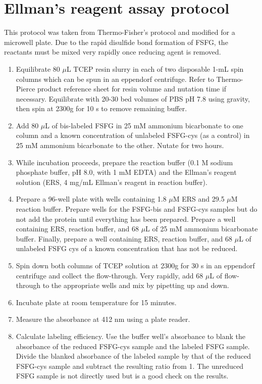 \section{Ellman's reagent assay protocol}

This protocol was taken from Thermo-Fisher's protocol and modified for a microwell plate.  Due to the rapid disulfide bond formation of FSFG, the reactants must be mixed very rapidly once reducing agent is removed.

\begin{enumerate}
\item Equilibrate 80 $\mu$L TCEP resin slurry in each of two disposable 1-mL spin columns which can be spun in an eppendorf centrifuge.  Refer to Thermo-Pierce product reference sheet for resin volume and nutation time if necessary.  Equilibrate with 20-30 bed volumes of PBS pH 7.8 using gravity, then spin at 2300g for 10 s to remove remaining buffer. 
\item Add 80 $\mu$L of bis-labeled FSFG in 25 mM ammonium bicarbonate to one column and a known concentration of unlabeled FSFG-cys (as a control) in 25 mM ammonium bicarbonate to the other. Nutate for two hours.
\item While incubation proceeds, prepare the reaction buffer (0.1 M sodium phosphate buffer, pH 8.0, with 1 mM EDTA) and the Ellman's reagent solution (ERS, 4 mg/mL Ellman's reagent in reaction buffer).
\item Prepare a 96-well plate with wells containing 1.8 $\mu$M ERS and 29.5 $\mu$M reaction buffer.  Prepare wells for the FSFG-bis and FSFG-cys samples but do not add the protein until everything has been prepared.  Prepare a well containing ERS, reaction buffer, and 68 $\mu$L of 25 mM ammonium bicarbonate buffer.  Finally, prepare a well containing ERS, reaction buffer, and 68 $\mu$L of unlabeled FSFG cys of a known concentration that has not be reduced.
\item Spin down both columns of TCEP solution at 2300g for 30 s in an eppendorf centrifuge and collect the flow-through.  Very rapidly, add 68 $\mu$L of flow-through to the appropriate wells and mix by pipetting up and down.
\item Incubate plate at room temperature for 15 minutes.
\item Measure the absorbance at 412 nm using a plate reader.
\item Calculate labeling efficiency.  Use the buffer well's absorbance to blank the absorbance of the reduced FSFG-cys sample and the labeled FSFG sample.  Divide the blanked absorbance of the labeled sample by that of the reduced FSFG-cys sample and subtract the resulting ratio from 1.  The unreduced FSFG sample is not directly used but is a good check on the results.
\end{enumerate}